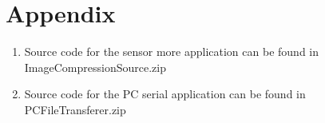 \chapter{Appendix}

\begin{enumerate}
\item Source code for the sensor more application can be found in ImageCompressionSource.zip  \label{App:SourceCode}
\item Source code for the PC serial application can be found in PCFileTransferer.zip 
\end{enumerate}